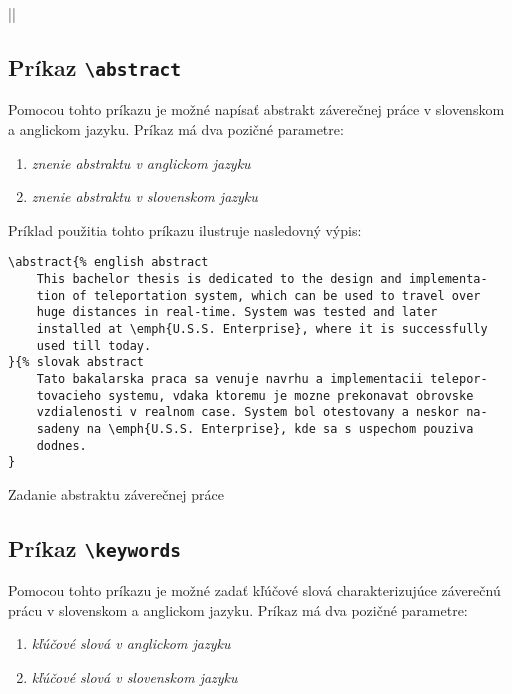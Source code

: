 ||


\subsection{Príkaz {\tt \textbackslash{}abstract}}

Pomocou tohto príkazu je možné napísať abstrakt záverečnej práce v slovenskom a anglickom jazyku. Príkaz má dva pozičné parametre:

\begin{enumerate}
    \item {\it znenie abstraktu v anglickom jazyku}
    \item {\it znenie abstraktu v slovenskom jazyku}
\end{enumerate}

Príklad použitia tohto príkazu ilustruje nasledovný výpis:

\begin{listing}[ht!]
\begin{verbatim}
\abstract{% english abstract
    This bachelor thesis is dedicated to the design and implementa-
    tion of teleportation system, which can be used to travel over
    huge distances in real-time. System was tested and later 
    installed at \emph{U.S.S. Enterprise}, where it is successfully
    used till today.
}{% slovak abstract
    Tato bakalarska praca sa venuje navrhu a implementacii telepor-
    tovacieho systemu, vdaka ktoremu je mozne prekonavat obrovske 
    vzdialenosti v realnom case. System bol otestovany a neskor na-
    sadeny na \emph{U.S.S. Enterprise}, kde sa s uspechom pouziva 
    dodnes.
}
\end{verbatim}
\caption{Zadanie abstraktu záverečnej práce}
\end{listing}


\subsection{Príkaz {\tt \textbackslash{}keywords}}

Pomocou tohto príkazu je možné zadať kľúčové slová charakterizujúce záverečnú prácu v slovenskom a anglickom jazyku. Príkaz má dva pozičné parametre:

\begin{enumerate}
    \item {\it kľúčové slová v anglickom jazyku}
    \item {\it kľúčové slová v slovenskom jazyku}
\end{enumerate}

